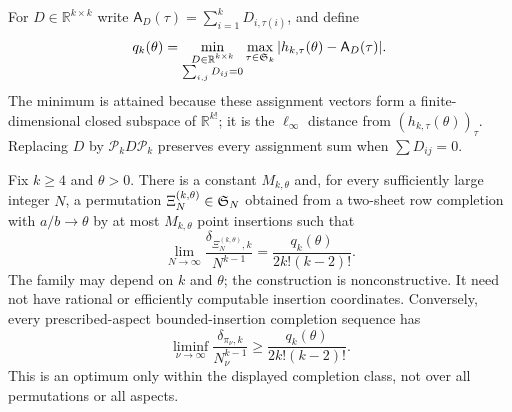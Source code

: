 For $D\in\mathbb R^{k\times k}$ write
$\mathsf A_D(\tau)=\sum_{i=1}^kD_{i,\tau(i)}$, and define
\[
 q_k(\theta)=\min_{\substack{D\in\mathbb R^{k\times k}\\
                       \sum_{i,j}D_{ij}=0}}
       \max_{\tau\in\mathfrak S_k}|h_{k,\tau}(\theta)-\mathsf A_D(\tau)|.
\]
The minimum is attained because these assignment vectors form a
finite-dimensional closed subspace of $\mathbb R^{k!}$; it is the
$\ell_\infty$ distance from $(h_{k,\tau}(\theta))_\tau$.  Replacing $D$ by
$\mathcal P_kD\mathcal P_k$ preserves every assignment sum when
$\sum D_{ij}=0$.

\begin{theorem}\label{thm:fixed-k-insertion}
Fix $k\ge4$ and $\theta>0$. There is a constant $M_{k,\theta}$ and, for every sufficiently large
integer $N$, a permutation $\Xi_N^{(k,\theta)}\in\mathfrak S_N$ obtained from a
two-sheet row completion with $a/b\to\theta$ by at most $M_{k,\theta}$ point insertions such
that
\[
 \lim_{N\to\infty}\frac{\delta_{\Xi_N^{(k,\theta)},k}}{N^{k-1}}
 =\frac{q_k(\theta)}{2k!(k-2)!}.
\]
The family may depend on $k$ and $\theta$; the construction is nonconstructive. It
need not have rational or efficiently computable insertion coordinates.
Conversely, every prescribed-aspect bounded-insertion completion sequence has
\[
 \liminf_{\nu\to\infty}
 \frac{\delta_{\pi_\nu,k}}{N_\nu^{k-1}}
 \geq\frac{q_k(\theta)}{2k!(k-2)!}.
\]
This is an optimum only within the displayed completion class, not over all
permutations or all aspects.
\end{theorem}

